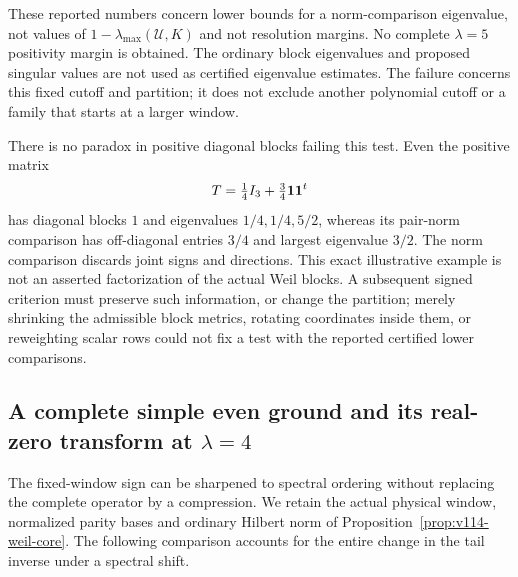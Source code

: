 \documentclass[11pt]{article}
\theoremstyle{remark}
\begin{document}
These reported numbers concern lower bounds for a norm-comparison eigenvalue,
not values of $1-\lambda_{\max}(\mathcal U,K)$ and not resolution
margins. No complete $\lambda=5$ positivity margin is obtained.
The ordinary block eigenvalues and proposed singular values are not
used as certified eigenvalue estimates. The failure concerns this
fixed cutoff and partition; it does not exclude another polynomial
cutoff or a family that starts at a larger window.

There is no paradox in positive diagonal blocks failing this test.
Even the positive matrix
\[
 T=\tfrac14 I_3+\tfrac34{\bf1}{\bf1}^t
\]
has diagonal blocks $1$ and eigenvalues $1/4,1/4,5/2$, whereas its
pair-norm comparison has off-diagonal entries $3/4$ and largest
eigenvalue $3/2$. The norm comparison discards joint signs and
directions. This exact illustrative example is not an asserted
factorization of the actual Weil blocks. A subsequent signed
criterion must preserve such information, or change the partition;
merely shrinking the admissible block metrics, rotating coordinates
inside them, or reweighting scalar rows could not fix a test with the
reported certified lower comparisons.

\subsection*{A complete simple even ground and its real-zero transform at $\lambda=4$}

The fixed-window sign can be sharpened to spectral ordering without
replacing the complete operator by a compression. We retain the actual
physical window, normalized parity bases and ordinary Hilbert norm of
Proposition~\ref{prop:v114-weil-core}. The following comparison accounts
for the entire change in the tail inverse under a spectral shift.
\end{document}
